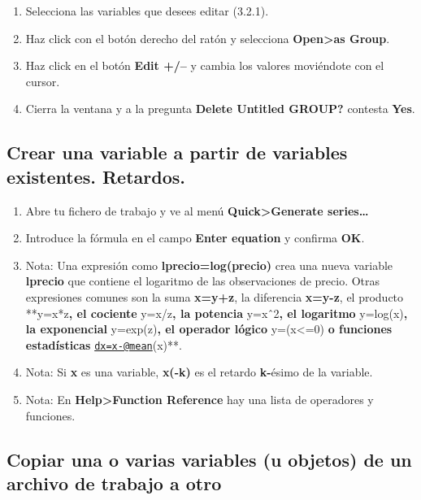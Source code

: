 \documentclass[
]{book}
\providecommand{\tightlist}{%
  \setlength{\itemsep}{0pt}\setlength{\parskip}{0pt}}
\begin{document}
\begin{enumerate}
\def\labelenumi{\arabic{enumi}.}
\tightlist
\item
  Selecciona las variables que desees editar (3.2.1).
\item
  Haz click con el botón derecho del ratón y selecciona \textbf{Open\textgreater as Group}.
\item
  Haz click en el botón \textbf{Edit +/--} y cambia los valores moviéndote con el cursor.
\item
  Cierra la ventana y a la pregunta \textbf{Delete Untitled GROUP?} contesta \textbf{Yes}.
\end{enumerate}

\hypertarget{crear-una-variable-a-partir-de-variables-existentes.-retardos.}{%
\subsection{Crear una variable a partir de variables existentes. Retardos.}\label{crear-una-variable-a-partir-de-variables-existentes.-retardos.}}

\begin{enumerate}
\def\labelenumi{\arabic{enumi}.}
\tightlist
\item
  Abre tu fichero de trabajo y ve al menú \textbf{Quick\textgreater Generate series\ldots{}}
\item
  Introduce la fórmula en el campo \textbf{Enter equation} y confirma \textbf{OK}.
\item
  Nota: Una expresión como \textbf{lprecio=log(precio)} crea una nueva variable \textbf{lprecio} que contiene el logaritmo de las observaciones de precio. Otras expresiones comunes son la suma \textbf{x=y+z}, la diferencia \textbf{x=y-z}, el producto **y=x*z\textbf{, el cociente }y=x/z\textbf{, la potencia }y=xˆ2\textbf{, el logaritmo }y=log(x)\textbf{, la exponencial }y=exp(z)\textbf{, el operador lógico }y=(x\textless=0)\textbf{ o funciones estadísticas }\href{mailto:dx=x-@mean}{\nolinkurl{dx=x-@mean}}(x)**.
\item
  Nota: Si \textbf{x} es una variable, \textbf{x(-k)} es el retardo \textbf{k-}ésimo de la variable.
\item
  Nota: En \textbf{Help\textgreater Function Reference} hay una lista de operadores y funciones.
\end{enumerate}

\hypertarget{copiar-una-o-varias-variables-u-objetos-de-un-archivo-de-trabajo-a-otro}{%
\subsection{Copiar una o varias variables (u objetos) de un archivo de trabajo a otro}\label{copiar-una-o-varias-variables-u-objetos-de-un-archivo-de-trabajo-a-otro}}
\end{document}
